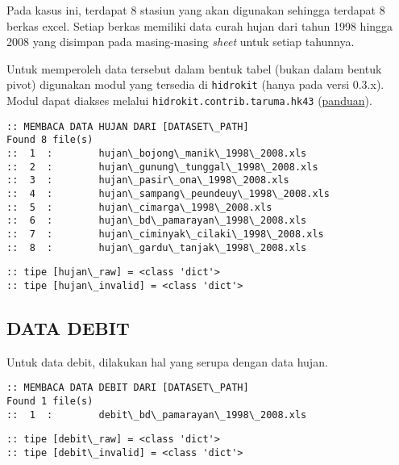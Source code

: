 \documentclass[11pt]{article}
\begin{document}
Pada kasus ini, terdapat 8 stasiun yang akan digunakan sehingga terdapat
8 berkas excel. Setiap berkas memiliki data curah hujan dari tahun 1998
hingga 2008 yang disimpan pada masing-masing \emph{sheet} untuk setiap
tahunnya.

Untuk memperoleh data tersebut dalam bentuk tabel (bukan dalam bentuk
pivot) digunakan modul yang tersedia di \texttt{hidrokit} (hanya pada
versi 0.3.x). Modul dapat diakses melalui
\texttt{hidrokit.contrib.taruma.hk43}
(\href{https://nbviewer.jupyter.org/gist/taruma/a9dd4ea61db2526853b99600909e9c50}{panduan}).

    \begin{Verbatim}[commandchars=\\\{\}]
:: MEMBACA DATA HUJAN DARI [DATASET\_PATH]
Found 8 file(s)
::  1  :        hujan\_bojong\_manik\_1998\_2008.xls
::  2  :        hujan\_gunung\_tunggal\_1998\_2008.xls
::  3  :        hujan\_pasir\_ona\_1998\_2008.xls
::  4  :        hujan\_sampang\_peundeuy\_1998\_2008.xls
::  5  :        hujan\_cimarga\_1998\_2008.xls
::  6  :        hujan\_bd\_pamarayan\_1998\_2008.xls
::  7  :        hujan\_ciminyak\_cilaki\_1998\_2008.xls
::  8  :        hujan\_gardu\_tanjak\_1998\_2008.xls
    \end{Verbatim}

    \begin{Verbatim}[commandchars=\\\{\}]
:: tipe [hujan\_raw] = <class 'dict'>
:: tipe [hujan\_invalid] = <class 'dict'>
    \end{Verbatim}

    \hypertarget{data-debit}{%
\subsection{DATA DEBIT}\label{data-debit}}

Untuk data debit, dilakukan hal yang serupa dengan data hujan.

    \begin{Verbatim}[commandchars=\\\{\}]
:: MEMBACA DATA DEBIT DARI [DATASET\_PATH]
Found 1 file(s)
::  1  :        debit\_bd\_pamarayan\_1998\_2008.xls
    \end{Verbatim}

    \begin{Verbatim}[commandchars=\\\{\}]
:: tipe [debit\_raw] = <class 'dict'>
:: tipe [debit\_invalid] = <class 'dict'>
    \end{Verbatim}
\end{document}
